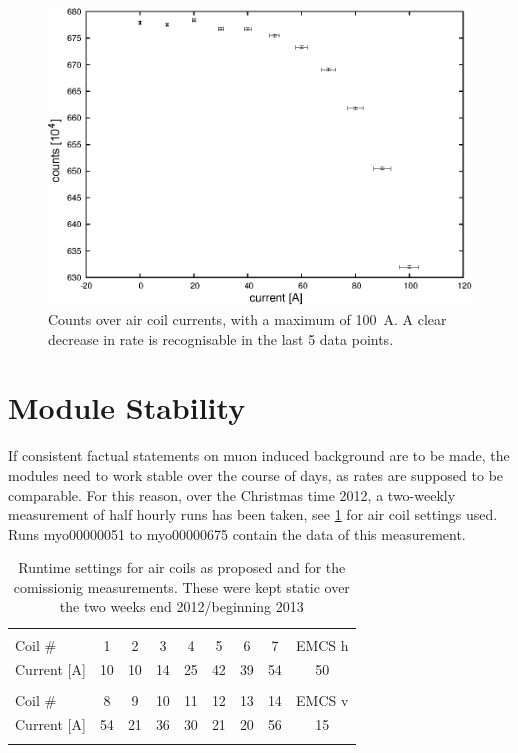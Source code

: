   \begin{figure}

  \centering
  	\includegraphics[width = 0.9 \textwidth]{graphics/aircoilCounts/aircoilsCountsCurrent.eps}
  	\caption{Counts over air coil currents, with a maximum of \SI{100}{\ampere}. A clear decrease in rate is recognisable in the last 5 data points.}
  	\label{fig:aircoilCountsCurrent}
  \end{figure}
  

  \section{Module Stability}
  \label{ch:Analysis:sec:Module Stability}
  If consistent factual statements on muon induced background are to be made, the modules need to work stable over the course of days, as rates are supposed to be comparable. For this reason, over the Christmas time 2012, a two-weekly measurement of half hourly runs has been taken, see \ref{tab:airCoilSettingsChristmas} for air coil settings used. Runs myo00000051 to myo00000675 contain the data of this measurement.
  \begin{table}
  \centering
   \begin{tabular}{|l|ccccccc|c|}
    \hline
    &&&&&&&&\\
    Coil \#	&1	&2	&3	&4	&5	&6	&7	&EMCS h	\\
    Current [A]	&10	&10	&14	&25	&42	&39	&54	&50  	\\
    &&&&&&&&\\
    Coil \# 	&8	&9	&10	&11	&12	&13	&14	&EMCS v	\\
    Current [A]	&54	&21	&36	&30	&21	&20	&56	&15    	\\
    &&&&&&&&\\
    \hline
   \end{tabular}
  \caption{Runtime settings for air coils as proposed and for the comissionig measurements. These were kept static over the two weeks end 2012/beginning 2013}
  \label{tab:airCoilSettingsChristmas}
  \end{table}

